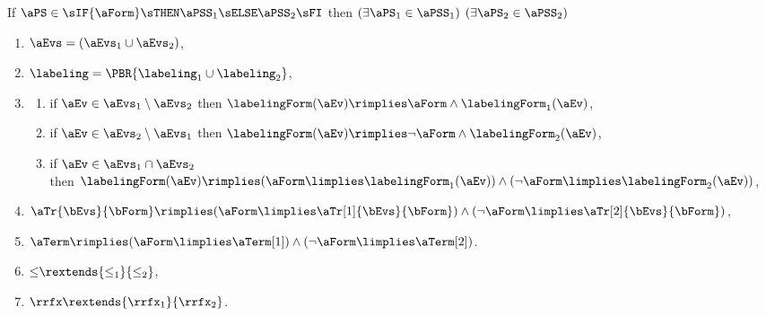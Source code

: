 \begin{definition}
  \noindent
  If $\aPS \in \sIF{\aForm}\sTHEN\aPSS_1\sELSE\aPSS_2\sFI$ then
  $(\exists\aPS_1\in\aPSS_1)$ $(\exists\aPS_2\in\aPSS_2)$
  \begin{multicols}{2}
    \begin{enumerate}[topsep=0pt,label=(\textsc{i}\arabic*),ref=\textsc{i}\arabic*]
    \item \label{if-E}
      $\aEvs = (\aEvs_1\cup\aEvs_2)$,
    \item \label{if-lambda}
      ${\labeling}=\PBR{{\labeling_1}\cup {\labeling_2}}$, 
    \item[] 
      \begin{enumerate}[leftmargin=0pt]
      \item \label{if-kappa1}
        if $\aEv\in\aEvs_1\setminus\aEvs_2$ then $\labelingForm(\aEv) \rimplies \aForm\land\labelingForm_1(\aEv)$,
      \item \label{if-kappa2}
        if $\aEv\in\aEvs_2\setminus\aEvs_1$ then $\labelingForm(\aEv) \rimplies \neg\aForm\land\labelingForm_2(\aEv)$, 
      \item \label{if-kappa12}
        if $\aEv\in\aEvs_1\cap\aEvs_2$\\ then
        $\labelingForm(\aEv) \rimplies (\aForm\limplies\labelingForm_1(\aEv))\land(\neg\aForm\limplies\labelingForm_2(\aEv))$,
      \end{enumerate}
    \item \label{if-tau}
      $\aTr{\bEvs}{\bForm} \rimplies
      (\aForm\limplies\aTr[1]{\bEvs}{\bForm})\land(\neg\aForm\limplies\aTr[2]{\bEvs}{\bForm})$,
    \item \label{if-term}
      $\aTerm \rimplies (\aForm\limplies\aTerm[1])\land(\neg\aForm\limplies\aTerm[2])$.
    \item \label{if-le-extends}
      ${\le}\rextends{\le_1}{\le_2}$, 
    \item \label{if-rf-extends}
      ${\rrfx}\rextends{\rrfx_1}{\rrfx_2}$.
    \end{enumerate}
  \end{multicols}


\end{definition}
